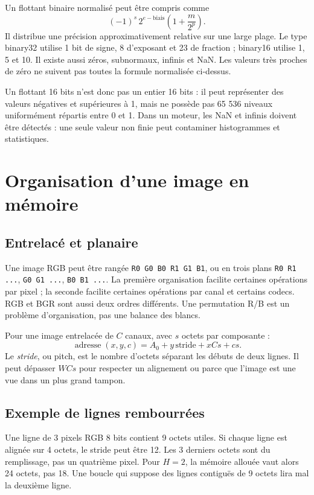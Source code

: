 Un flottant binaire normalisé peut être compris comme
\begin{equation}
(-1)^s\,2^{e-\mathrm{biais}}\left(1+\frac{m}{2^p}\right).
\end{equation}
Il distribue une précision approximativement relative sur une
large plage. Le type binary32 utilise 1 bit de signe, 8 d'exposant
et 23 de fraction ; binary16 utilise 1, 5 et 10. Il existe aussi
zéros, subnormaux, infinis et NaN. Les valeurs très proches de zéro
ne suivent pas toutes la formule normalisée ci-dessus.

Un flottant 16 bits n'est donc pas un entier 16 bits : il peut
représenter des valeurs négatives et supérieures à 1, mais ne
possède pas 65 536 niveaux uniformément répartis entre 0 et 1.
Dans un moteur, les NaN et infinis doivent être détectés : une
seule valeur non finie peut contaminer histogrammes et statistiques.

\section{Organisation d'une image en mémoire}
\subsection{Entrelacé et planaire}
Une image RGB peut être rangée
\texttt{R0 G0 B0 R1 G1 B1}, ou en trois plans
\texttt{R0 R1 ...}, \texttt{G0 G1 ...}, \texttt{B0 B1 ...}.
La première organisation facilite certaines opérations par pixel ;
la seconde facilite certaines opérations par canal et certains codecs.
RGB et BGR sont aussi deux ordres différents. Une permutation R/B
est un problème d'organisation, pas une balance des blancs.

Pour une image entrelacée de $C$ canaux, avec $s$ octets par composante :
\begin{equation}\label{eq:address}
\operatorname{adresse}(x,y,c)=A_0+y\,\mathrm{stride}+xCs+cs.
\end{equation}
Le \emph{stride}, ou pitch, est le nombre d'octets séparant les
débuts de deux lignes. Il peut dépasser $WCs$ pour respecter un
alignement ou parce que l'image est une vue dans un plus grand tampon.

\subsection{Exemple de lignes rembourrées}
Une ligne de 3 pixels RGB 8 bits contient 9 octets utiles.
Si chaque ligne est alignée sur 4 octets, le stride peut être 12.
Les 3 derniers octets sont du remplissage, pas un quatrième pixel.
Pour $H=2$, la mémoire allouée vaut alors 24 octets, pas 18.
Une boucle qui suppose des lignes contiguës de 9 octets lira mal
la deuxième ligne.

